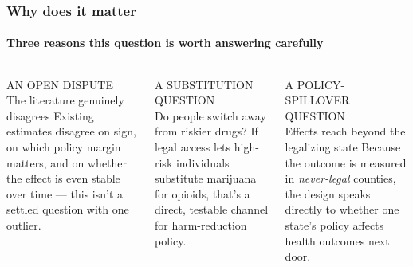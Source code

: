 \documentclass[aspectratio=169,11pt]{beamer}
\begin{document}
\begin{frame}
\frametitle{Why does it matter}
\framesubtitle{Three reasons this question is worth answering carefully}

\vspace{0.3cm}
\begin{columns}[t,totalwidth=\textwidth]

\begin{block}{\scriptsize\textcolor{accent}{AN OPEN DISPUTE} \\ \normalsize The literature genuinely disagrees}
\footnotesize Existing estimates disagree on sign, on which policy margin matters, and on whether the effect is even stable over time --- this isn't a settled question with one outlier.
\end{block}

\begin{block}{\scriptsize\textcolor{accent}{A SUBSTITUTION QUESTION} \\ \normalsize Do people switch away from riskier drugs?}
\footnotesize If legal access lets high-risk individuals substitute marijuana for opioids, that's a direct, testable channel for harm-reduction policy.
\end{block}

\begin{block}{\scriptsize\textcolor{accent}{A POLICY-SPILLOVER QUESTION} \\ \normalsize Effects reach beyond the legalizing state}
\footnotesize Because the outcome is measured in \emph{never-legal} counties, the design speaks directly to whether one state's policy affects health outcomes next door.
\end{block}

\end{columns}
\end{frame}
\end{document}
